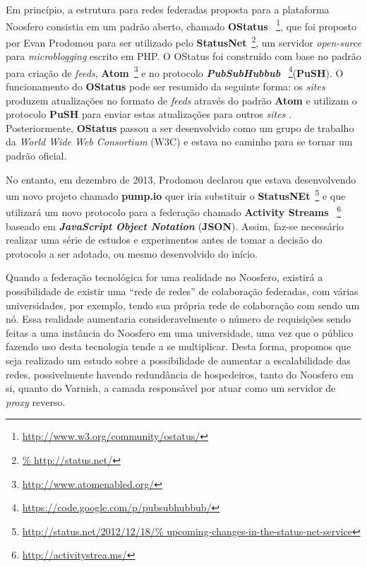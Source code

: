Em princípio, a estrutura para redes federadas proposta para a plataforma Noosfero
consistia em um padrão aberto, chamado \textbf{OStatus}
~\footnote{\url{http://www.w3.org/community/ostatus/}}, que foi proposto
por Evan Prodomou para ser utilizado pelo \textbf{StatusNet}~\footnote{\url{%
http://status.net/}}, um servidor  \textit{open-surce} para
\textit{microblogging} escrito em PHP.
%
O OStatus foi construído com base no padrão para criação de \textit{feeds},
\textbf{Atom}~\footnote{\url{http://www.atomenabled.org/}} e no
protocolo \textbf{\textit{PubSubHubbub}}%
~\footnote{\url{https://code.google.com/p/pubsubhubbub/}}(\textbf{PuSH}).
%
O funcionamento do \textbf{OStatus} pode ser resumido da seguinte forma:
os \textit{sites} produzem atualizações no formato de \textit{feeds} através
do padrão \textbf{Atom} e utilizam o protocolo \textbf{PuSH}
para enviar estas atualizações para outros \textit{sites} \cite{OStatusBasics}.
%
Posteriormente, \textbf{OStatus} passou a ser desenvolvido como um
grupo de trabalho da \textit{World Wide Web Consortium} (W3C) e estava no
caminho para se tornar um padrão oficial.

No entanto, em dezembro de 2013, Prodomou declarou que estava desenvolvendo
um novo projeto chamado \textbf{pump.io} quer iria substituir o
\textbf{StatusNEt}~\footnote{\url{http://status.net/2012/12/18/%
upcoming-changes-in-the-status-net-service}} e que utilizará um novo
protocolo para a federação chamado \textbf{Activity Streams}%
~\footnote{\url{http://activitystrea.ms/}} baseado em \textbf{\textit{%
JavaScript Object Notation}} (\textbf{JSON}).
%
Assim, faz-se necessário realizar uma série de estudos e experimentos
antes de tomar a decisão do protocolo a ser adotado, ou mesmo desenvolvido
do início.

Quando a federação tecnológica for uma realidade no Noosfero, existirá a
possibilidade de existir uma ``rede de redes'' de colaboração federadas,
com várias universidades, por exemplo, tendo sua própria rede de colaboração
com sendo um nó.
%
Essa realidade aumentaria consideravelmente o número de requisições sendo
feitas a uma instância do Noosfero em uma universidade, uma vez que o público
fazendo uso desta tecnologia tende a se multiplicar.
%
Desta forma, propomos que seja realizado um estudo sobre a possibilidade
de aumentar a escalabilidade das redes, possivelmente havendo redundância
de hospedeiros, tanto do Noosfero em si, quanto do Varnish, a camada
responsável por atuar como um servidor de \textit{proxy} reverso.



